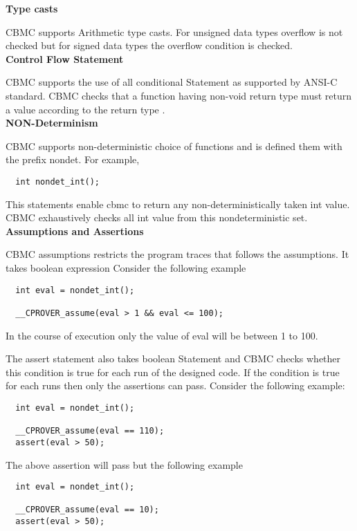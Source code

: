  \textbf{Type casts}
 
 CBMC supports Arithmetic type casts. For unsigned data types overflow is not 
 checked but for signed data types the overflow condition is checked. \\
 
 \textbf{Control Flow Statement}
 
 CBMC supports the use of all conditional Statement as supported by ANSI-C standard.
 CBMC checks that a function having non-void return type must return a value 
 according to the return type . \\
 
 \textbf{NON-Determinism}
 
 CBMC supports non-deterministic choice of functions and is defined them with 
 the prefix nondet. For example,
 \begin{verbatim}
  int nondet_int();
 \end{verbatim}

This statements enable cbmc to return any non-deterministically taken int value.
CBMC exhaustively checks all int value from this nondeterministic set. \\


\textbf{Assumptions and Assertions}

 CBMC assumptions restricts the program traces that follows the assumptions.
 It takes boolean expression Consider the following example
 
 \begin{verbatim}
  int eval = nondet_int();
  
  __CPROVER_assume(eval > 1 && eval <= 100);
 \end{verbatim}
 In the course of execution only the value of eval will be between 1 to 100.
 
 The assert statement also takes boolean Statement and CBMC checks whether this
 condition is true for each run of the designed code. If the condition is true 
 for each runs then only the assertions can pass. Consider the following example:
 
\begin{verbatim}
  int eval = nondet_int();
  
  __CPROVER_assume(eval == 110);
  assert(eval > 50);
 \end{verbatim}
 
The above assertion will pass but the following example

\begin{verbatim}
  int eval = nondet_int();
  
  __CPROVER_assume(eval == 10);
  assert(eval > 50);
 \end{verbatim}
 
